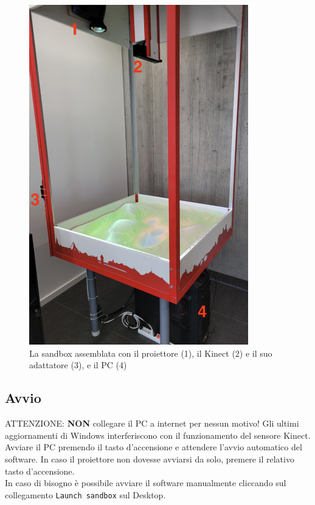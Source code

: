\documentclass[12pt]{article}
\begin{document}
\begin{figure}[H]
	\centering
	\includegraphics[width=0.85\textwidth]{img/sandbox.jpg}
	\caption*{La sandbox assemblata con il proiettore (1), il Kinect (2) e il suo adattatore (3), e il PC (4)}
\end{figure}


\subsection{Avvio}

ATTENZIONE: \textbf{NON} collegare il PC a internet per nessun motivo! Gli ultimi aggiornamenti
di Windows interferiscono con il funzionamento del sensore Kinect.\\

Avviare il PC premendo il tasto d'accensione e attendere l'avvio automatico del software. In caso il proiettore non dovesse avviarsi da solo, premere il relativo tasto d'accensione.\\
In caso di bisogno è possibile avviare il software manualmente cliccando sul collegamento
\texttt{Launch sandbox} sul Desktop.\\
\end{document}
